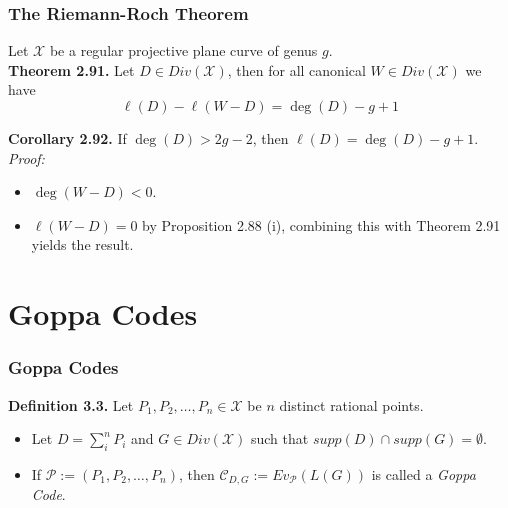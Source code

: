\documentclass[10pt]{beamer}
\begin{document}
\begin{frame}
  \frametitle{The Riemann-Roch Theorem}
  Let $\mathcal{X}$ be a regular projective plane curve of genus $g$. \\
  \textbf{Theorem 2.91.} Let $D \in Div(\mathcal{X})$, then for all canonical $W \in Div(\mathcal{X})$ we have
  \begin{equation*}
    \ell(D) - \ell(W - D) = \deg(D) - g + 1
  \end{equation*}

  \pause
  \textbf{Corollary 2.92.} If $\deg(D) > 2g - 2$, then $\ell(D) = \deg(D) - g + 1$.
  \pause
  \textit{Proof:}
  \begin{itemize}
    \item $\deg(W - D) < 0$.
  \pause
    \item $\ell(W - D) = 0$ by Proposition 2.88 (i), combining this with Theorem 2.91 yields the result.
  \end{itemize}
\end{frame}

\section{Goppa Codes}%
\label{sec:goppa}

\begin{frame}
  \frametitle{Goppa Codes}
  \textbf{Definition 3.3.} Let $P_1, P_2, \ldots, P_{n} \in \mathcal{X}$ be $n$ distinct rational points.
  \begin{itemize}
  \pause
    \item Let $D = \sum^n_i P_i$ and $G \in Div(\mathcal{X})$ such that $supp(D) \cap supp(G) = \emptyset$.
  \pause
    \item If $\mathcal{P} := \left(P_1, P_2, \ldots, P_{n}\right)$, then $\mathcal{C}_{D, G} := Ev_{\mathcal{P}}(L(G))$ is called a \textit{Goppa Code}.
  \end{itemize}
\end{frame}
\end{document}
